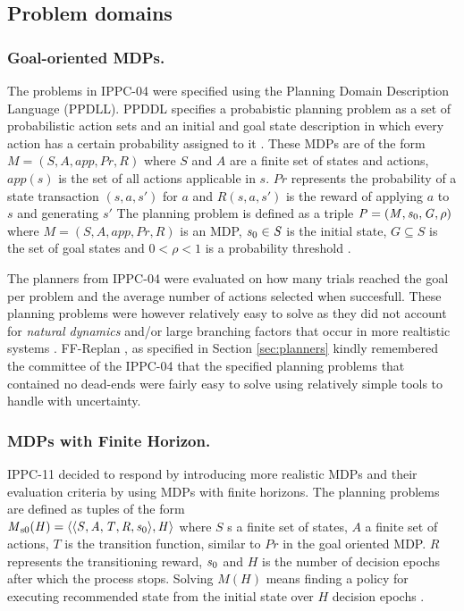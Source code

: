 \documentclass[runningheads,a4paper]{llncs}
\begin{document}
\subsection{Problem domains}
\subsubsection{Goal-oriented MDPs. }The problems in IPPC-04 were specified using the Planning Domain Description Language (PPDLL). PPDDL specifies a probabistic planning problem as a set of probabilistic action sets and an initial and goal state description in which every action has a certain probability assigned to it \cite{FFReplan}. These MDPs are of the form $\mathit{M = (S, A, app, Pr, R)}$ where $\mathit{S}$ and $\mathit{A}$ are a finite set of states and actions, $\mathit{app(s)}$ is the set of all actions applicable in $\mathit{s}$. $\mathit{Pr}$ represents the probability of a state transaction $\mathit{(s, a, s')}$ for $\mathit{a}$ and $\mathit{R(s, a, s')}$ is the reward of applying $\mathit{a}$ to $\mathit{s}$ and generating $\mathit{s'}$ The planning problem is defined as a triple $\mathit{P = (M, s\textsubscript{0}, G, \rho)}$ where $\mathit{M = (S, A, app, Pr, R)}$ is an MDP, $\mathit{s\textsubscript{0} \in S}$ is the initial state, $\mathit{G \subseteq S}$ is the set of goal states and $\mathit{0 < \rho < 1}$ is a probability threshold \cite{teichteil2010incremental}.

 The planners from IPPC-04 were evaluated on how many trials reached the goal per problem and the average number of actions selected when succesfull. These planning problems were however relatively easy to solve as they did not account for \emph{natural dynamics} and/or large branching factors that occur in more realtistic systems \cite{kolobov2012glutton}. FF-Replan \cite{FFReplan}, as specified in Section \ref{sec:planners} kindly remembered the committee of the IPPC-04 that the specified planning problems that contained no dead-ends were fairly easy to solve using relatively simple tools to handle with uncertainty. 

\subsubsection{MDPs with Finite Horizon. }IPPC-11 decided to respond by introducing more realistic MDPs and their evaluation criteria by using MDPs with finite horizons. The planning problems are defined as tuples of the form \\ $\mathit{M\textsubscript{s0}(H) = \langle \langle S, A, T, R, s\textsubscript{0} \rangle , H \rangle }$ where $\mathit{S}$ s a finite set of states, $\mathit{A}$ a finite set of actions, $\mathit{T}$ is the transition function, similar to $\mathit{Pr}$ in the goal oriented MDP. $\mathit{R}$ represents the transitioning reward, $\mathit{s\textsubscript{0}}$ and $\mathit{H}$ is the number of decision epochs after which the process stops. Solving $\mathit{M(H)}$ means finding a policy for executing recommended state from the initial state over $\mathit{H}$ decision epochs \cite{kolobov2012gourmand}.
\end{document}
